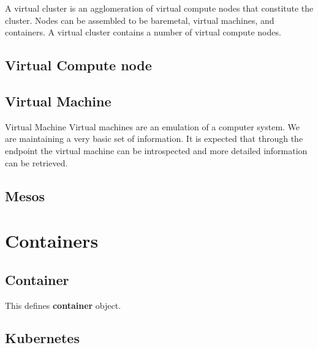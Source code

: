 \documentclass[9pt,twocolumn,twoside]{styles/osajnl}
\begin{document}
A virtual cluster is an agglomeration of virtual compute nodes that
constitute the cluster. Nodes can be assembled to be baremetal,
virtual machines, and containers. A virtual cluster contains a number
of virtual compute nodes.  
 

\subsection{Virtual Compute node}


\subsection{Virtual Machine}

Virtual Machine 
Virtual machines are an emulation of a computer system. We are maintaining a very basic set of information. It is expected that through the endpoint the virtual machine can be introspected and more detailed information can be retrieved. 


\subsection{Mesos}


\section{Containers}

\subsection{Container}

This defines \textbf{container} object.


\subsection{Kubernetes}
\end{document}
